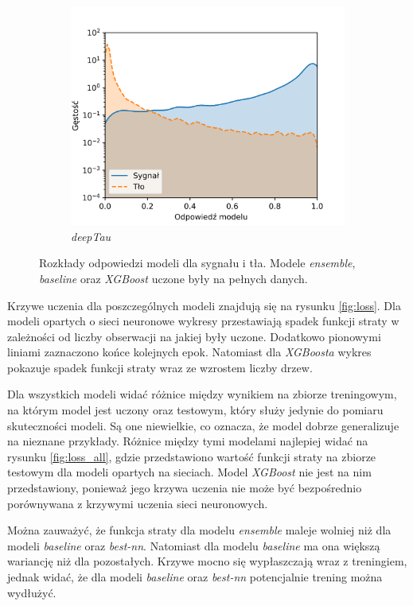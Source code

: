 \documentclass{pracalicmgr}
\begin{document}
\begin{figure}[H]
\begin{subfigure}{.5\textwidth}
	\includegraphics[width=1\textwidth]{density_deepTau.png}
	\caption{\textit{deepTau}}
	\end{subfigure}
	\caption{Rozkłady odpowiedzi modeli dla sygnału i tła. Modele \textit{ensemble}, \textit{baseline} oraz \textit{XGBoost} uczone były na pełnych danych.}
	\label{fig:dist}
	\end{figure}
	
	Krzywe uczenia dla poszczególnych modeli znajdują się na rysunku \ref{fig:loss}. Dla modeli opartych o sieci neuronowe wykresy przestawiają spadek funkcji straty w zależności od liczby obserwacji na jakiej były uczone. Dodatkowo pionowymi liniami zaznaczono końce kolejnych epok. Natomiast dla \textit{XGBoosta} wykres pokazuje spadek funkcji straty wraz ze wzrostem liczby drzew.
	
	Dla wszystkich modeli widać różnice między wynikiem na zbiorze treningowym, na którym model jest uczony oraz testowym, który służy jedynie do pomiaru skuteczności modeli. Są one niewielkie, co oznacza, że model dobrze generalizuje na nieznane przykłady. Różnice między tymi modelami najlepiej widać na rysunku \ref{fig:loss_all}, gdzie przedstawiono wartość funkcji straty na zbiorze testowym dla modeli opartych na sieciach. Model \textit{XGBoost} nie jest na nim przedstawiony, ponieważ jego krzywa uczenia nie może być bezpośrednio porównywana z krzywymi uczenia sieci neuronowych. 
	
	Można zauważyć, że funkcja straty dla modelu \textit{ensemble} maleje wolniej niż dla modeli \textit{baseline} oraz \textit{best-nn}. Natomiast dla modelu \textit{baseline} ma ona większą wariancję niż dla pozostałych. Krzywe mocno się wypłaszczają wraz z treningiem, jednak widać, że dla modeli \textit{baseline} oraz \textit{best-nn} potencjalnie trening można wydłużyć.
	
\end{document}
